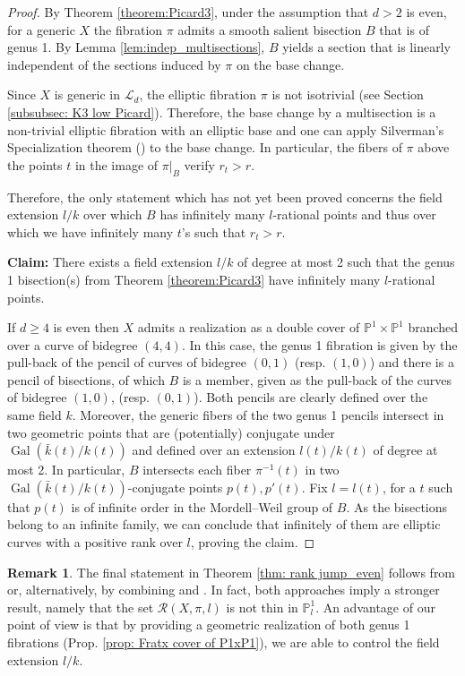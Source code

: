 \documentclass{amsart}
\theoremstyle{definition}
\newtheorem{remark}[theorem]{Remark}
\numberwithin{equation}{section}
\DeclareMathOperator{\Gal}{Gal}
\begin{document}
\begin{proof}
 

By Theorem \ref{theorem:Picard3}, under the assumption that $d>2$ is even, for a generic $X$ the fibration $\pi$ admits a smooth salient bisection $B$ that is of genus 1. By Lemma \ref{lem:indep_multisections}, $B$ yields a section that is linearly independent of the sections induced by $\pi$ on the base change. 

Since $X$ is generic in $\mathcal{L}_d$, the elliptic  fibration $\pi$ is not isotrivial (see Section \ref{subsubsec: K3 low Picard}). Therefore, the base change by a multisection  is a non-trivial elliptic fibration with an elliptic base and one can apply Silverman's Specialization theorem (\cite[Theorem C]{Silverman}) to the base change. In particular, the fibers of $\pi$ above the points $t$ in the image of $\pi|_B$ verify $r_t>r$. 

Therefore,
the only statement which has not yet been proved concerns the field extension $l/k$ over which $B$ has infinitely many $l$-rational points and thus over which we have infinitely many $t$'s such that $r_t>r$.  

\textbf{Claim:} There exists a field extension $l/k$ of degree at most 2 such that the genus 1 bisection(s) from Theorem \ref{theorem:Picard3} have infinitely many $l$-rational points.

If $d\geq 4$ is even then $X$ admits a realization as a double cover of $\mathbb{P}^1\times \mathbb{P}^1$ branched over a curve of bidegree $(4,4)$. 
In this case, the genus 1 fibration is given by the pull-back of the pencil of curves of bidegree $(0,1)$ (resp. $(1,0)$) and there is a pencil of bisections, of which $B$ is a member, given as the pull-back of the curves of bidegree $(1,0)$, (resp. $(0,1)$). Both pencils are clearly defined over the same field $k$. Moreover, the generic fibers of the two genus 1 pencils intersect in two geometric points that are (potentially) conjugate under $\Gal(\bar{k}(t)/k(t))$ and defined over an extension $l(t)/k(t)$ of degree at most 2. In particular, $B$ intersects each fiber $\pi^{-1}(t)$ in two $\Gal(\bar{k}(t)/k(t))$-conjugate points $p(t), p'(t)$. Fix $l=l(t)$, for a  $t$ such that $p(t)$ is of infinite order in the Mordell--Weil group of $B$. As the bisections belong to an infinite family, we can conclude that infinitely of them are elliptic curves with a positive rank over $l$, proving the claim.
\end{proof} 
\begin{remark}
The final statement in Theorem \ref{thm: rank jump_even} follows from \cite[Theorem 1.1]{PastenSalgado} or, alternatively, by combining \cite[Theorem 1.1]{GM} and \cite[Th\'eor\`eme 1.1]{CT}. In fact, both approaches imply a stronger result, namely that the set $\mathcal{R}(X,\pi, l)$ is not thin in $\mathbb{P}^1_l$.
An advantage of our point of view is that by providing a geometric realization of both genus 1 fibrations (Prop. \ref{prop: Fratx cover of P1xP1}), we are able to control the field extension $l/k$.
\end{remark}
\end{document}

